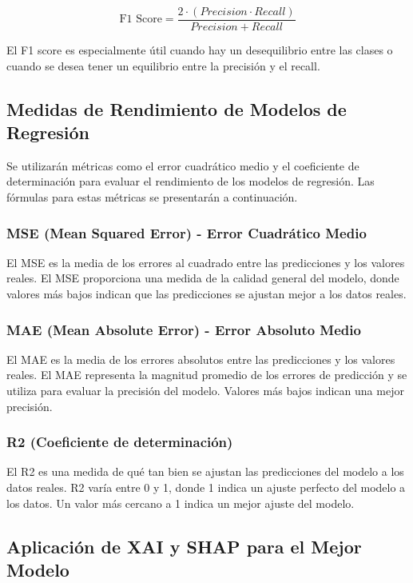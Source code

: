 \begin{equation}
  \text{F1 Score} = \frac{2 \cdot (Precision \cdot Recall)}{Precision + Recall}
\end{equation}

El F1 score es especialmente útil cuando hay un desequilibrio entre las clases o cuando se desea tener un equilibrio entre la precisión y el recall.

\subsection{Medidas de Rendimiento de Modelos de Regresión}

Se utilizarán métricas como el error cuadrático medio y el coeficiente de determinación para evaluar el rendimiento de los modelos de regresión. Las fórmulas para estas métricas se presentarán a continuación.

\subsubsection{MSE (Mean Squared Error) - Error Cuadrático Medio}
El MSE es la media de los errores al cuadrado entre las predicciones y los valores reales. El MSE proporciona una medida de la calidad general del modelo, donde valores más bajos indican que las predicciones se ajustan mejor a los datos reales.

\subsubsection{MAE (Mean Absolute Error) - Error Absoluto Medio}
El MAE es la media de los errores absolutos entre las predicciones y los valores reales. El MAE representa la magnitud promedio de los errores de predicción y se utiliza para evaluar la precisión del modelo. Valores más bajos indican una mejor precisión.

\subsubsection{R2 (Coeficiente de determinación)}
El R2 es una medida de qué tan bien se ajustan las predicciones del modelo a los datos reales. R2 varía entre 0 y 1, donde 1 indica un ajuste perfecto del modelo a los datos. Un valor más cercano a 1 indica un mejor ajuste del modelo.

\subsection{Aplicación de XAI y SHAP para el Mejor Modelo}

